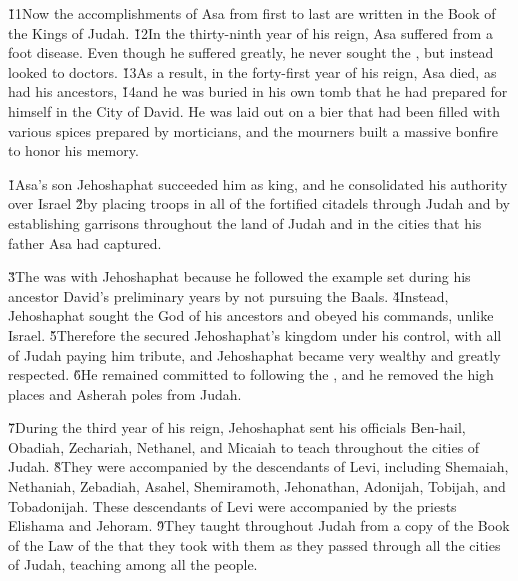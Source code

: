 \v{11}Now the accomplishments of Asa from first to last are written in the Book of the Kings of Judah. \v{12}In the thirty-ninth year of his reign, Asa suffered from a foot disease. Even though he suffered greatly, he never sought the , but instead looked to doctors. \v{13}As a result, in the forty-first year of his reign, Asa died, as had his ancestors, \v{14}and he was buried in his own tomb that he had prepared for himself in the City of David. He was laid out on a bier that had been filled with various spices prepared by morticians, and the mourners built a massive bonfire to honor his memory.

\v{1}Asa's son Jehoshaphat succeeded him as king, and he consolidated his authority over Israel \v{2}by placing troops in all of the fortified citadels through Judah and by establishing garrisons throughout the land of Judah and in the cities that his father Asa had captured.

\v{3}The  was with Jehoshaphat because he followed the example set during his ancestor David's preliminary years by not pursuing the Baals. \v{4}Instead, Jehoshaphat sought the God of his ancestors and obeyed his commands, unlike Israel. \v{5}Therefore the  secured Jehoshaphat's kingdom under his control, with all of Judah paying him tribute, and Jehoshaphat became very wealthy and greatly respected. \v{6}He remained committed to following the , and he removed the high places and Asherah poles from Judah.

\v{7}During the third year of his reign, Jehoshaphat sent his officials Ben-hail, Obadiah, Zechariah, Nethanel, and Micaiah to teach throughout the cities of Judah. \v{8}They were accompanied by the descendants of Levi, including Shemaiah, Nethaniah, Zebadiah, Asahel, Shemiramoth, Jehonathan, Adonijah, Tobijah, and Tobadonijah. These descendants of Levi were accompanied by the priests Elishama and Jehoram. \v{9}They taught throughout Judah from a copy of the Book of the Law of the  that they took with them as they passed through all the cities of Judah, teaching among all the people.

